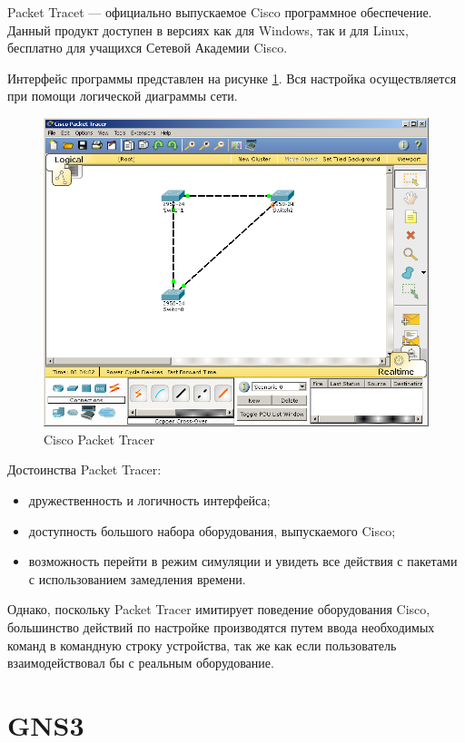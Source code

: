 	Packet Tracet  –-- официально выпускаемое Cisco
	программное обеспечение. Данный продукт доступен в версиях как для
	Windows, так и для Linux, бесплатно для учащихся Сетевой Академии
	Cisco.
	
	Интерфейс программы представлен на рисунке \ref{fig:packet_tracer}. Вся настройка осуществляется при помощи логической диаграммы сети.
	
	\begin{figure}[h!]
		\centering
		\includegraphics[width=0.9\linewidth]{pic/packet_tracer}
		\caption{Cisco Packet Tracer}
		\label{fig:packet_tracer}
	\end{figure}
	
	Достоинства Packet Tracer:
	
	\begin{itemize}
		\item дружественность и логичность интерфейса;
		\item доступность большого набора оборудования, выпускаемого Cisco;
		\item возможность перейти в режим симуляции и увидеть все действия с пакетами с использованием замедления времени.
	\end{itemize}
	
	Однако, поскольку Packet Tracer имитирует поведение оборудования Cisco, большинство действий по настройке производятся путем ввода необходимых команд в командную строку устройства, так же как если пользователь взаимодействовал бы с реальным оборудование.
	
	\section{GNS3}
	

